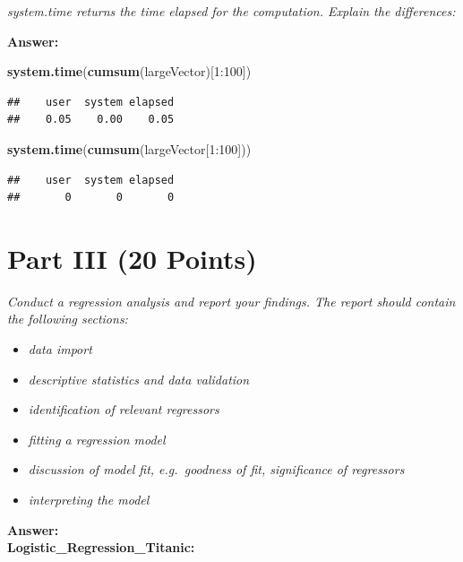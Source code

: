 \documentclass[12,]{article}
\newenvironment{Shaded}{\begin{snugshade}}{\end{snugshade}}
\newcommand{\KeywordTok}[1]{\textcolor[rgb]{0.13,0.29,0.53}{\textbf{{#1}}}}
\newcommand{\DecValTok}[1]{\textcolor[rgb]{0.00,0.00,0.81}{{#1}}}
\newcommand{\NormalTok}[1]{{#1}}
\providecommand{\tightlist}{%
  \setlength{\itemsep}{0pt}\setlength{\parskip}{0pt}}
\begin{document}
\emph{system.time returns the time elapsed for the computation. Explain
the differences:}

\textbf{Answer:}

\begin{Shaded}
\begin{Highlighting}[]
\KeywordTok{system.time}\NormalTok{(}\KeywordTok{cumsum}\NormalTok{(largeVector)[}\DecValTok{1}\NormalTok{:}\DecValTok{100}\NormalTok{])}
\end{Highlighting}
\end{Shaded}

\begin{verbatim}
##    user  system elapsed 
##    0.05    0.00    0.05
\end{verbatim}

\begin{Shaded}
\begin{Highlighting}[]
\KeywordTok{system.time}\NormalTok{(}\KeywordTok{cumsum}\NormalTok{(largeVector[}\DecValTok{1}\NormalTok{:}\DecValTok{100}\NormalTok{]))}
\end{Highlighting}
\end{Shaded}

\begin{verbatim}
##    user  system elapsed 
##       0       0       0
\end{verbatim}

\newpage

\section{Part III (20 Points)}\label{part-iii-20-points}

\emph{Conduct a regression analysis and report your findings. The report
should contain the following sections:}

\begin{itemize}
\tightlist
\item
  \emph{data import}
\item
  \emph{descriptive statistics and data validation}
\item
  \emph{identification of relevant regressors}
\item
  \emph{fitting a regression model}
\item
  \emph{discussion of model fit, e.g.~goodness of fit, significance of
  regressors}
\item
  \emph{interpreting the model}
\end{itemize}

\textbf{Answer:}\\
\textbf{Logistic\_Regression\_Titanic:}
\end{document}
